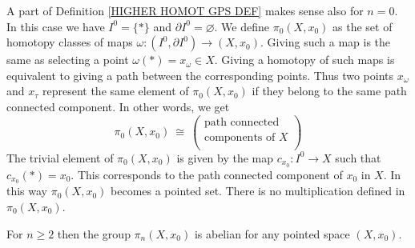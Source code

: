 \begin{note}
A part of Definition \ref{HIGHER HOMOT GPS DEF} makes sense also for $n=0$. 
In this case we have $I^{0} = \{\ast\}$ and $\partial I^{0} = \varnothing$. 
We define $\pi_{0}(X, x_{0})$ as the set of homotopy classes of maps 
$\omega \colon (I^{0}, \partial I^{0}) \to (X, x_{0})$.  
Giving such a map is the same as selecting a point
$\omega(\ast) = x_{\omega} \in X$. Giving a homotopy of such maps is equivalent to giving
a path between the corresponding points. Thus two points $x_{\omega}$ and 
$x_{\tau}$ represent the same element of $\pi_{0}(X, x_{0})$ if they belong to
the same path connected component. In other words, we get 
\[
\pi_{0}(X, x_{0}) \ \cong \  
\begin{pmatrix}
\text{path connected} \\[1mm]
\text{components of $X$} \\
\end{pmatrix} 
\]
The trivial element of $\pi_{0}(X, x_{0})$ is given by the map $c_{x_{0}}\colon I^{0} \to X$
such that $c_{x_{0}}(\ast) = x_{0}$. This corresponds to the path connected component 
of $x_{0}$ in $X$. In this way  $\pi_{0}(X, x_{0})$ becomes a pointed set. There is no 
multiplication defined in $\pi_{0}(X, x_{0})$.
\end{note}


\begin{theorem}
\label{HIGHER HOMOT GPS ABELIAN THM}
For $n\geq 2$ then the group $\pi_{n}(X, x_{0})$ is abelian for any  pointed space 
$(X, x_{0})$.   
\end{theorem}

